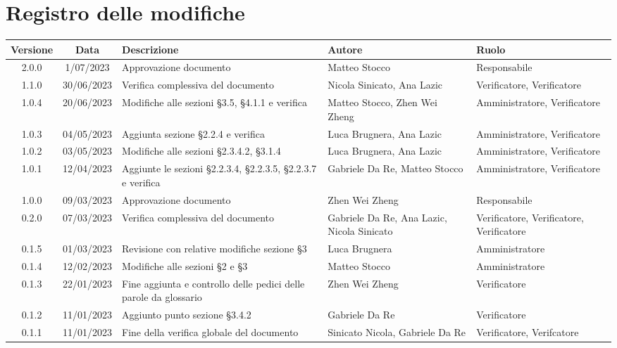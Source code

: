 \section*{Registro delle modifiche}
\begin{center}
\renewcommand\tabularxcolumn[1]{>{\Centering}m{#1}}
\setlength\extrarowheight{5pt}
\begin{tabularx}{\textwidth}{| c | c | X | X | X |} 
\hline
\rowcolor{white}
 \textbf{Versione} & \textbf{Data} & \textbf{Descrizione} & \textbf{Autore} & \textbf{Ruolo}\\
 \hline
 2.0.0 & 1/07/2023 & Approvazione documento & Matteo Stocco & Responsabile\\
 \hline
 1.1.0 & 30/06/2023 & Verifica complessiva del documento & Nicola Sinicato, Ana Lazic & Verificatore, Verificatore\\
 \hline
 1.0.4 & 20/06/2023 & Modifiche alle sezioni §3.5, §4.1.1 e verifica & Matteo Stocco, Zhen Wei Zheng & Amministratore, Verificatore\\
 \hline
 1.0.3 & 04/05/2023 & Aggiunta sezione §2.2.4 e verifica & Luca Brugnera, Ana Lazic & Amministratore, Verificatore\\
 \hline
 1.0.2 & 03/05/2023 & Modifiche alle sezioni §2.3.4.2, §3.1.4 & Luca Brugnera, Ana Lazic & Amministratore, Verificatore\\
 \hline
 1.0.1 & 12/04/2023 & Aggiunte le sezioni §2.2.3.4, §2.2.3.5, §2.2.3.7 e verifica & Gabriele Da Re, Matteo Stocco & Amministratore, Verificatore\\
 \hline
 1.0.0 & 09/03/2023 & Approvazione documento & Zhen Wei Zheng & Responsabile\\
 \hline
 0.2.0 & 07/03/2023 & Verifica complessiva del documento & Gabriele Da Re, Ana Lazic, Nicola Sinicato & Verificatore, Verificatore, Verificatore\\
 \hline
 0.1.5 & 01/03/2023 & Revisione con relative modifiche sezione §3 & Luca Brugnera & Amministratore\\
 \hline
 0.1.4 & 12/02/2023 & Modifiche alle sezioni §2 e §3 & Matteo Stocco & Amministratore\\
 \hline
 0.1.3 & 22/01/2023 & Fine aggiunta e controllo delle pedici delle parole da glossario & Zhen Wei Zheng & Verificatore \\
 \hline
 0.1.2 & 11/01/2023 & Aggiunto punto sezione §3.4.2 & Gabriele Da Re & Verificatore\\
 \hline
 0.1.1 & 11/01/2023 & Fine della verifica globale del documento & Sinicato Nicola, Gabriele Da Re & Verificatore, Verifcatore\\

\end{tabularx}
\end{center}
